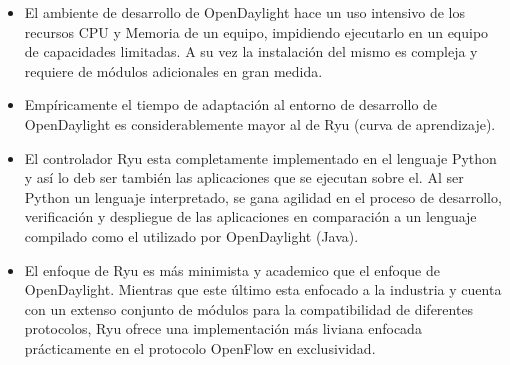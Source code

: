 \begin{itemize}
\item El ambiente de desarrollo de OpenDaylight hace un uso intensivo de los recursos CPU y Memoria de un equipo, impidiendo ejecutarlo en un equipo de capacidades limitadas. A su vez la instalaci\'on del mismo es compleja y requiere de m\'odulos adicionales en gran medida.

\item Empíricamente el tiempo de adaptaci\'on al entorno de desarrollo de OpenDaylight es considerablemente mayor al de Ryu (curva de aprendizaje).  

\item El controlador Ryu esta completamente implementado en el lenguaje Python y as\'i lo deb ser también las aplicaciones que se ejecutan sobre el. Al ser Python un lenguaje interpretado, se gana agilidad en el proceso de desarrollo, verificaci\'on y despliegue de las aplicaciones en comparaci\'on a un lenguaje compilado como el utilizado por OpenDaylight (Java).

\item El enfoque de Ryu es m\'as minimista y academico que el enfoque de OpenDaylight. Mientras que este \'ultimo esta enfocado a la industria y cuenta con un extenso conjunto de módulos para la compatibilidad de diferentes protocolos, Ryu ofrece una implementaci\'on m\'as liviana enfocada prácticamente en el protocolo OpenFlow en exclusividad. 
\end{itemize}  
